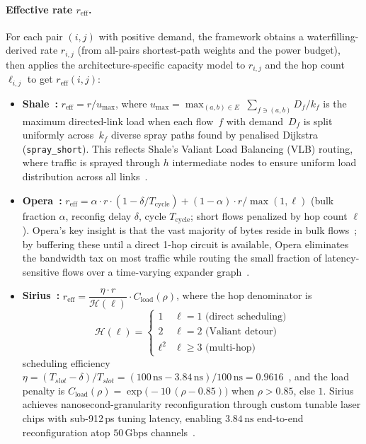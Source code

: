 \documentclass{article}
\begin{document}
    \paragraph{Effective rate $r_{\text{eff}}$.}
    For each pair $(i,j)$ with positive demand, the framework obtains a waterfilling-derived rate $r_{i,j}$ (from all-pairs shortest-path weights and the power budget), then applies the architecture-specific capacity model to $r_{i,j}$ and the hop count $\ell_{i,j}$ to get $r_{\text{eff}}(i,j)$:
    \begin{itemize}
        \item \textbf{Shale~\cite{shale}:} $r_{\text{eff}} = r / u_{\max}$, where $u_{\max} = \max_{(a,b)\in E}\; \sum_{f \ni (a,b)} D_f / k_f$ is the maximum directed-link load when each flow~$f$ with demand~$D_f$ is split uniformly across~$k_f$ diverse spray paths found by penalised Dijkstra (\texttt{spray\_short}). This reflects Shale's Valiant Load Balancing (VLB) routing, where traffic is sprayed through $h$ intermediate nodes to ensure uniform load distribution across all links~\cite{shale}.
        \item \textbf{Opera~\cite{opera}:} $r_{\text{eff}} = \alpha \cdot r \cdot (1 - \delta/T_{\text{cycle}}) + (1-\alpha) \cdot r / \max(1,\ell)$ (bulk fraction $\alpha$, reconfig delay $\delta$, cycle $T_{\text{cycle}}$; short flows penalized by hop count $\ell$). Opera's key insight is that the vast majority of bytes reside in bulk flows~\cite{opera}; by buffering these until a direct 1-hop circuit is available, Opera eliminates the bandwidth tax on most traffic while routing the small fraction of latency-sensitive flows over a time-varying expander graph~\cite{opera}.
        \item \textbf{Sirius~\cite{sirius}:} $r_{\text{eff}} = \dfrac{\eta \cdot r}{\mathcal{H}(\ell)} \cdot C_{\text{load}}(\rho)$, where the hop denominator is
        \[
            \mathcal{H}(\ell) =
            \begin{cases}
                1       & \ell = 1 \text{ (direct scheduling)}\\
                2       & \ell = 2 \text{ (Valiant detour)}\\
                \ell^2  & \ell \geq 3 \text{ (multi-hop)}
            \end{cases}
        \]
        scheduling efficiency $\eta = (T_{slot} - \delta)/T_{slot} = (100\,\text{ns} - 3.84\,\text{ns})/100\,\text{ns} = 0.9616$~\cite{sirius}, and the load penalty is $C_{\text{load}}(\rho) = \exp\!\bigl(-10\,(\rho - 0.85)\bigr)$ when $\rho > 0.85$, else $1$. Sirius achieves nanosecond-granularity reconfiguration through custom tunable laser chips with sub-912\,ps tuning latency, enabling $3.84\,\text{ns}$ end-to-end reconfiguration atop $50\,\text{Gbps}$ channels~\cite{sirius}.
    \end{itemize}
\end{document}
